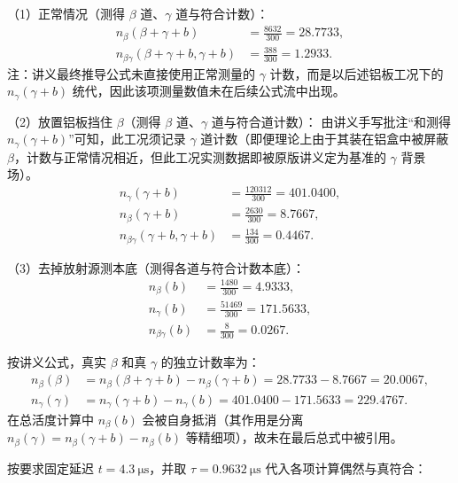 \documentclass[12pt,a4paper]{article}
\begin{document}
（1）正常情况（测得 $\beta$ 道、$\gamma$ 道与符合计数）：
\begin{align}
    n_{\beta}(\beta+\gamma+b) &= \frac{8632}{300}=28.7733, \\
    n_{\beta\gamma}(\beta+\gamma+b, \gamma+b) &= \frac{388}{300}=1.2933.
\end{align}
注：讲义最终推导公式未直接使用正常测量的 $\gamma$ 计数，而是以后述铝板工况下的 $n_\gamma(\gamma+b)$ 统代，因此该项测量数值未在后续公式流中出现。

（2）放置铝板挡住 $\beta$（测得 $\beta$ 道、$\gamma$ 道与符合道计数）：
由讲义手写批注“和测得 $n_\gamma(\gamma+b)$”可知，此工况须记录 $\gamma$ 道计数（即便理论上由于其装在铝盒中被屏蔽 $\beta$，计数与正常情况相近，但此工况实测数据即被原版讲义定为基准的 $\gamma$ 背景场）。
\begin{align}
    n_{\gamma}(\gamma+b) &= \frac{120312}{300}=401.0400, \\
    n_{\beta}(\gamma+b) &= \frac{2630}{300}=8.7667, \\
    n_{\beta\gamma}(\gamma+b, \gamma+b) &= \frac{134}{300}=0.4467.
\end{align}

（3）去掉放射源测本底（测得各道与符合计数本底）：
\begin{align}
    n_{\beta}(b) &= \frac{1480}{300}=4.9333, \\
    n_{\gamma}(b) &= \frac{51469}{300}=171.5633, \\
    n_{\beta\gamma}(b) &= \frac{8}{300}=0.0267.
\end{align}

按讲义公式，真实 $\beta$ 和真 $\gamma$ 的独立计数率为：
\begin{align}
    n_{\beta}(\beta) &= n_{\beta}(\beta+\gamma+b)-n_{\beta}(\gamma+b)=28.7733-8.7667=20.0067, \\
    n_{\gamma}(\gamma) &= n_{\gamma}(\gamma+b)-n_{\gamma}(b)=401.0400-171.5633=229.4767.
\end{align}
在总活度计算中 $n_{\beta}(b)$ 会被自身抵消（其作用是分离 $n_{\beta}(\gamma)=n_{\beta}(\gamma+b)-n_{\beta}(b)$ 等精细项），故未在最后总式中被引用。

按要求固定延迟 $t=\SI{4.3}{\micro\second}$，并取 $\tau=\SI{0.9632}{\micro\second}$ 代入各项计算偶然与真符合：
\end{document}

